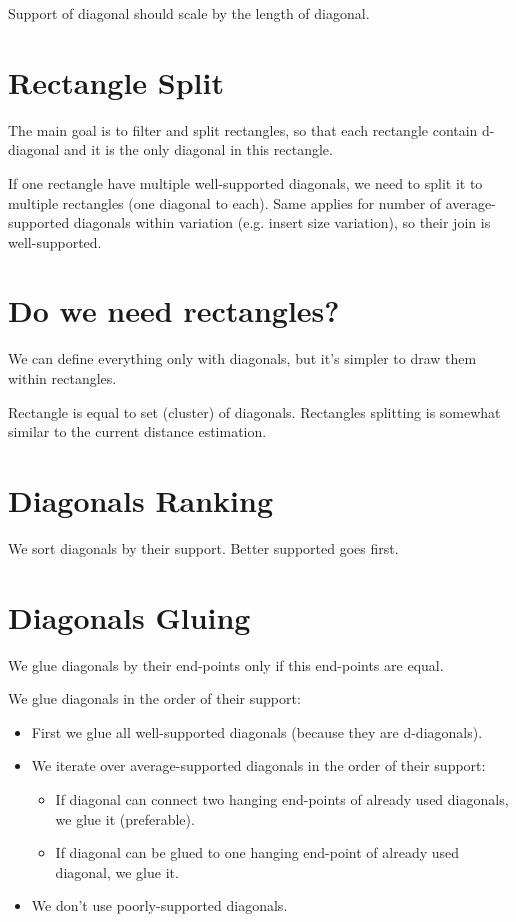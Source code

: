 \documentclass[a4paper]{article}
\begin{document}
Support of diagonal should scale by the length of diagonal.

\section{Rectangle Split}

The main goal is to filter and split rectangles, so that each rectangle contain d-diagonal and it is the only diagonal in this rectangle.

If one rectangle have multiple well-supported diagonals, we need to split it to multiple rectangles (one diagonal to each). Same applies for number of average-supported diagonals within variation (e.g. insert size variation), so their join is well-supported.

\section{Do we need rectangles?}

We can define everything only with diagonals, but it's simpler to draw them within rectangles.

Rectangle is equal to set (cluster) of diagonals. Rectangles splitting is somewhat similar to the current distance estimation.

\section{Diagonals Ranking}

We sort diagonals by their support. Better supported goes first.

\section{Diagonals Gluing}

We glue diagonals by their end-points only if this end-points are equal.

We glue diagonals in the order of their support:
\begin{itemize}
\item First we glue all well-supported diagonals (because they are d-diagonals).
\item We iterate over average-supported diagonals in the order of their support:
\begin{itemize}
\item If diagonal can connect two hanging end-points of already used diagonals, we glue it (preferable).
\item If diagonal can be glued to one hanging end-point of already used diagonal, we glue it.
\end{itemize}
\item We don't use poorly-supported diagonals.
\end{itemize}
\end{document}
